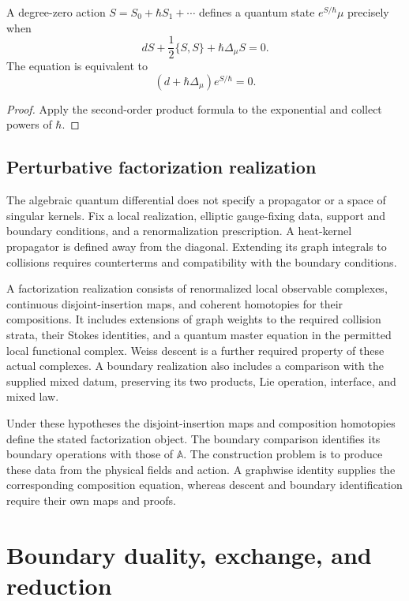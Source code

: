 \begin{theorem}
A degree-zero action $S=S_0+\hbar S_1+\cdots$ defines a quantum state $e^{S/\hbar}\mu$ precisely when
\[
 dS+\frac12\{S,S\}+\hbar\Delta_\mu S=0.
\]
The equation is equivalent to
\[
 (d+\hbar\Delta_\mu)e^{S/\hbar}=0.
\]
\end{theorem}
\begin{proof}
Apply the second-order product formula to the exponential and collect powers of $\hbar$.
\end{proof}

\chapter{Perturbative factorization realization}
The algebraic quantum differential does not specify a propagator or a space of singular kernels. Fix a local realization, elliptic gauge-fixing data, support and boundary conditions, and a renormalization prescription. A heat-kernel propagator is defined away from the diagonal. Extending its graph integrals to collisions requires counterterms and compatibility with the boundary conditions.

\begin{definition}
A factorization realization consists of renormalized local observable complexes, continuous disjoint-insertion maps, and coherent homotopies for their compositions. It includes extensions of graph weights to the required collision strata, their Stokes identities, and a quantum master equation in the permitted local functional complex. Weiss descent is a further required property of these actual complexes. A boundary realization also includes a comparison with the supplied mixed datum, preserving its two products, Lie operation, interface, and mixed law.
\end{definition}

Under these hypotheses the disjoint-insertion maps and composition homotopies define the stated factorization object. The boundary comparison identifies its boundary operations with those of $\mathbb A$. The construction problem is to produce these data from the physical fields and action. A graphwise identity supplies the corresponding composition equation, whereas descent and boundary identification require their own maps and proofs.

\part{Boundary duality, exchange, and reduction}



